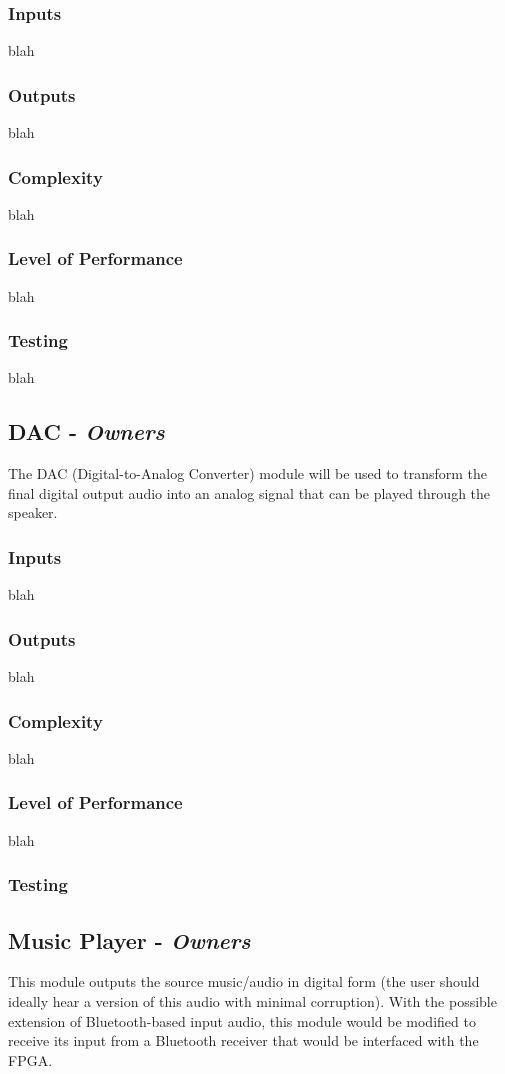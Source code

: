 \documentclass[12pt]{article}
\begin{document}
\begin{multicols}{2}
\subsubsection{Inputs}
blah
\subsubsection{Outputs}
blah
\subsubsection{Complexity}
blah
\subsubsection{Level of Performance}
blah
\subsubsection{Testing}
blah

\subsection{DAC - \textit{Owners}}
The DAC (Digital-to-Analog Converter) module will be used to transform the final digital output audio into an analog signal that can be played through the speaker.
\subsubsection{Inputs}
blah
\subsubsection{Outputs}
blah
\subsubsection{Complexity}
blah
\subsubsection{Level of Performance}
blah
\subsubsection{Testing}

\subsection{Music Player - \textit{Owners}}
This module outputs the source music/audio in digital form (the user should ideally hear a version of this audio with minimal corruption). With the possible extension of Bluetooth-based input audio, this module would be modified to receive its input from a Bluetooth receiver that would be interfaced with the FPGA.

\end{multicols}
\end{document}
